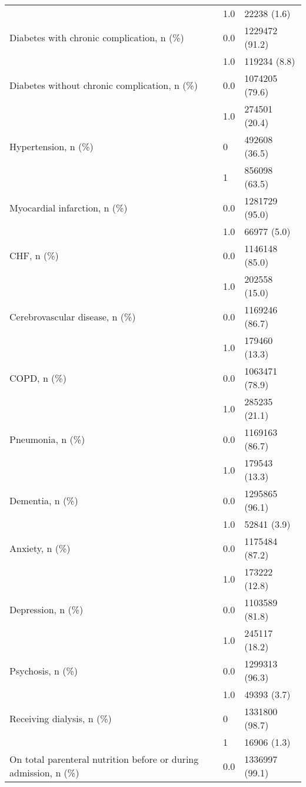 \begin{tabular}{lll}
                           & 1.0 &        22238 (1.6) \\
Diabetes with chronic complication, n (\%) & 0.0 &     1229472 (91.2) \\
                           & 1.0 &       119234 (8.8) \\
Diabetes without chronic complication, n (\%) & 0.0 &     1074205 (79.6) \\
                           & 1.0 &      274501 (20.4) \\
Hypertension, n (\%) & 0 &      492608 (36.5) \\
                           & 1 &      856098 (63.5) \\
Myocardial infarction, n (\%) & 0.0 &     1281729 (95.0) \\
                           & 1.0 &        66977 (5.0) \\
CHF, n (\%) & 0.0 &     1146148 (85.0) \\
                           & 1.0 &      202558 (15.0) \\
Cerebrovascular disease, n (\%) & 0.0 &     1169246 (86.7) \\
                           & 1.0 &      179460 (13.3) \\
COPD, n (\%) & 0.0 &     1063471 (78.9) \\
                           & 1.0 &      285235 (21.1) \\
Pneumonia, n (\%) & 0.0 &     1169163 (86.7) \\
                           & 1.0 &      179543 (13.3) \\
Dementia, n (\%) & 0.0 &     1295865 (96.1) \\
                           & 1.0 &        52841 (3.9) \\
Anxiety, n (\%) & 0.0 &     1175484 (87.2) \\
                           & 1.0 &      173222 (12.8) \\
Depression, n (\%) & 0.0 &     1103589 (81.8) \\
                           & 1.0 &      245117 (18.2) \\
Psychosis, n (\%) & 0.0 &     1299313 (96.3) \\
                           & 1.0 &        49393 (3.7) \\
Receiving dialysis, n (\%) & 0 &     1331800 (98.7) \\
                           & 1 &        16906 (1.3) \\
On total parenteral nutrition before or during admission, n (\%) & 0.0 &     1336997 (99.1) \\

\end{tabular}
